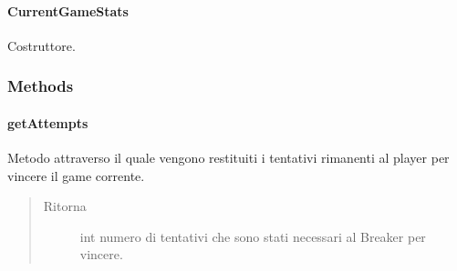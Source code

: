 \documentclass[letterpaper,10pt,italian,openany,oneside]{sphinxmanual}
\begin{document}
\paragraph{CurrentGameStats}
\label{\detokenize{source/it/unicam/cs/pa/mastermind/gamecore/CurrentGameStats:id1}}

\begin{fulllineitems}
\label{\detokenize{source/it/unicam/cs/pa/mastermind/gamecore/CurrentGameStats:it.unicam.cs.pa.mastermind.gamecore.CurrentGameStats.CurrentGameStats(BoardModel)}}
Costruttore.

\end{fulllineitems}



\subsubsection{Methods}
\label{\detokenize{source/it/unicam/cs/pa/mastermind/gamecore/CurrentGameStats:methods}}

\paragraph{getAttempts}
\label{\detokenize{source/it/unicam/cs/pa/mastermind/gamecore/CurrentGameStats:getattempts}}

\begin{fulllineitems}
\label{\detokenize{source/it/unicam/cs/pa/mastermind/gamecore/CurrentGameStats:it.unicam.cs.pa.mastermind.gamecore.CurrentGameStats.getAttempts()}}
Metodo attraverso il quale vengono restituiti i tentativi rimanenti al player per vincere il game corrente.
\begin{quote}\begin{description}
\item[{Ritorna}] \leavevmode
int numero di tentativi che sono stati necessari al Breaker per vincere.

\end{description}\end{quote}

\end{fulllineitems}
\end{document}
